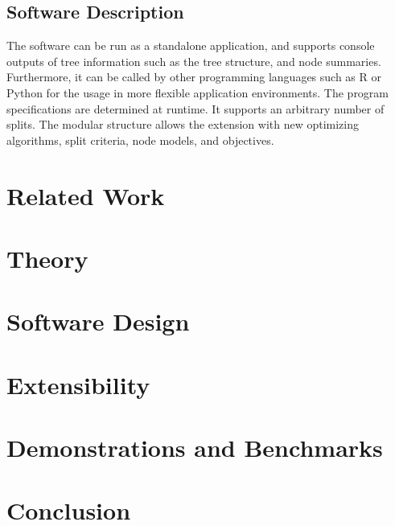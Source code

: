 \documentclass[a4paper, 11pt]{article}
\begin{document}
\subsection{Software Description}

The software can be run as a standalone application, and supports console outputs of tree information such as the tree structure, and node summaries. Furthermore, it can be called by other programming languages such as R or Python for the usage in more flexible application environments. The program specifications are determined at runtime. It supports an arbitrary number of splits. 
The modular structure allows the extension with 
new optimizing algorithms, split criteria, node models, and objectives. 


\section{Related Work}

\section{Theory}

\section{Software Design}

\section{Extensibility}

\section{Demonstrations and Benchmarks}

\section{Conclusion}
\end{document}
